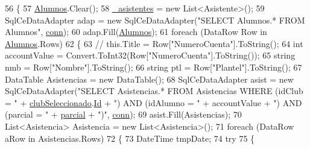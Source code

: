 \begin{DoxyCode}
56         \{
57             \hyperlink{class_asistencias__wpf_1_1_asistentes_populator_a5be02a2b0beb32f0c8b2aef488303359}{Alumnos}.Clear();
58             \hyperlink{class_asistencias__wpf_1_1_asistentes_populator_a84a4c12da1ef4556f1cfefbea12902b8}{\_asistentes} = \textcolor{keyword}{new} List<Asistente>();
59             SqlCeDataAdapter adap = \textcolor{keyword}{new} SqlCeDataAdapter(\textcolor{stringliteral}{"SELECT Alumnos.* FROM Alumnos"}, 
      \hyperlink{class_asistencias__wpf_1_1_asistentes_populator_aea7e955756112dc99c093514621320c7}{conn});
60             adap.Fill(\hyperlink{class_asistencias__wpf_1_1_asistentes_populator_a5be02a2b0beb32f0c8b2aef488303359}{Alumnos});
61             \textcolor{keywordflow}{foreach} (DataRow Row \textcolor{keywordflow}{in} \hyperlink{class_asistencias__wpf_1_1_asistentes_populator_a5be02a2b0beb32f0c8b2aef488303359}{Alumnos}.Rows)
62             \{
63                 \textcolor{comment}{// this.Title = Row["NumeroCuenta"].ToString();}
64                 \textcolor{keywordtype}{int} accountValue = Convert.ToInt32(Row[\textcolor{stringliteral}{"NumeroCuenta"}].ToString());
65                 \textcolor{keywordtype}{string} nmb = Row[\textcolor{stringliteral}{"Nombre"}].ToString();
66                 \textcolor{keywordtype}{string} ptl = Row[\textcolor{stringliteral}{"Plantel"}].ToString();
67                 DataTable Asistencias = \textcolor{keyword}{new} DataTable();
68                 SqlCeDataAdapter asist = \textcolor{keyword}{new} SqlCeDataAdapter(\textcolor{stringliteral}{"SELECT Asistencias.* FROM Asistencias WHERE
       (idClub = "} + \hyperlink{class_asistencias__wpf_1_1_asistentes_populator_a33a9f65088b3243c8473180e80e322d9}{clubSeleccionado}.\hyperlink{class_asistencias__wpf_1_1_club_a25ec9c585f6874004dc690ea2641ab0d}{Id} + \textcolor{stringliteral}{") AND (idAlumno = "} + accountValue + \textcolor{stringliteral}{") AND (parcial
       = "} + \hyperlink{class_asistencias__wpf_1_1_asistentes_populator_abe2a5ad9e46aa901e8c8e9bbf03ef653}{parcial} + \textcolor{stringliteral}{")"}, \hyperlink{class_asistencias__wpf_1_1_asistentes_populator_aea7e955756112dc99c093514621320c7}{conn});
69                 asist.Fill(Asistencias);
70                 List<Asistencia> Asistencia = \textcolor{keyword}{new} List<Asistencia>();
71                 \textcolor{keywordflow}{foreach} (DataRow aRow \textcolor{keywordflow}{in} Asistencias.Rows)
72                 \{
73                     DateTime tmpDate;
74                     \textcolor{keywordflow}{try}
75                     \{

\end{DoxyCode}
